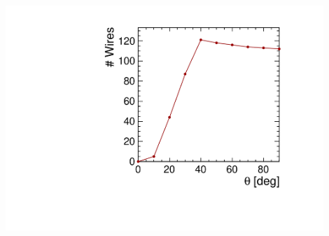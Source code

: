 \documentclass[aspectratio=169, hyperref={colorlinks=true,pdfpagelabels=false,linkcolor=black}, xcolor=dvipsnames,10pt]{beamer}
\begin{document}
\begin{frame}
\begin{columns}
    \vspace{-0.1cm}
    \centering
    \includegraphics[width=0.9\textwidth]{figures/numWires}

  \end{columns}


\end{frame}
\end{document}
